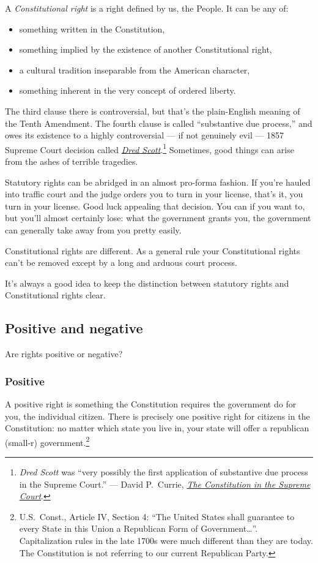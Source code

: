 \documentclass[10pt]{article}
\begin{document}
A {\it Constitutional right} is a right defined by us, the People.  It can be any of:

\begin{itemize}
\item something written in the Constitution,
\item something implied by the existence of another Constitutional right,
\item a cultural tradition inseparable from the American character, 
\item something inherent in the very concept of ordered liberty.
\end{itemize}

The third clause there is controversial, but that's the plain-English meaning of the Tenth Amendment.  The fourth clause is called ``substantive due process,'' and owes its existence to a highly controversial --- if not genuinely evil --- 1857 Supreme Court decision called \href{https://en.wikipedia.org/wiki/Dred_Scott_v._Sandford}{\it Dred Scott}.\footnote{{\it Dred Scott} was ``very possibly the first application of substantive due process in the Supreme Court.'' --- David P.~Currie, \href{https://press.uchicago.edu/ucp/books/book/chicago/C/bo5952705.html}{\it The Constitution in the Supreme Court}.}  Sometimes, good things can arise from the ashes of terrible tragedies.

Statutory rights can be abridged in an almost pro-forma fashion.  If you're hauled into traffic court and the judge orders you to turn in your license, that's it, you turn in your license.  Good luck appealing that decision.  You can if you want to, but you'll almost certainly lose: what the government grants you, the government can generally take away from you pretty easily.

Constitutional rights are different.  As a general rule your Constitutional rights can't be removed except by a long and arduous court process.

It's always a good idea to keep the distinction between statutory rights and Constitutional rights clear.

\subsection{Positive and negative}
Are rights positive or negative?

\subsubsection{Positive}
A positive right is something the Constitution requires the government do for you, the individual citizen.  There is precisely one positive right for citizens in the Constitution: no matter which state you live in, your state will offer a republican (small-r) government.\footnote{U.S.~Const., Article IV, Section 4: ``The United States shall guarantee to every State in this Union a Republican Form of Government\ldots''. Capitalization rules in the late 1700s were much different than they are today.  The Constitution is not referring to our current Republican Party.}
\end{document}
